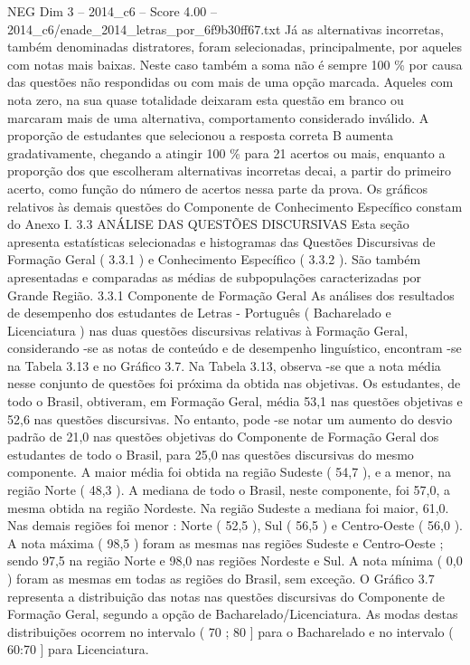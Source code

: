 \begin{textsample}{NEG Dim 3 – 2014\_c6 – Score 4.00 – 2014\_c6/enade\_2014\_letras\_por\_6f9b30ff67.txt}
Já as alternativas incorretas, também denominadas distratores, foram selecionadas, principalmente, por aqueles com notas mais baixas.
Neste caso também a soma não é sempre 100 \% por causa das questões não respondidas ou com mais de uma opção marcada.
Aqueles com nota zero, na sua quase totalidade deixaram esta questão em branco ou marcaram mais de uma alternativa, comportamento considerado inválido.
A proporção de estudantes que selecionou a resposta correta B aumenta gradativamente, chegando a atingir 100 \% para 21 acertos ou mais, enquanto a proporção dos que escolheram alternativas incorretas decai, a partir do primeiro acerto, como função do número de acertos nessa parte da prova.
Os gráficos relativos às demais questões do Componente de Conhecimento Específico constam do Anexo I. 3.3 ANÁLISE DAS QUESTÕES DISCURSIVAS Esta seção apresenta estatísticas selecionadas e histogramas das Questões Discursivas de Formação Geral ( 3.3.1 ) e Conhecimento Específico ( 3.3.2 ).
São também apresentadas e comparadas as médias de subpopulações caracterizadas por Grande Região. 3.3.1 Componente de Formação Geral As análises dos resultados de desempenho dos estudantes de Letras - Português ( Bacharelado e Licenciatura ) nas duas questões discursivas relativas à Formação Geral, considerando -se as notas de conteúdo e de desempenho linguístico, encontram -se na Tabela 3.13 e no Gráfico 3.7.
Na Tabela 3.13, observa -se que a nota média nesse conjunto de questões foi próxima da obtida nas objetivas.
Os estudantes, de todo o Brasil, obtiveram, em Formação Geral, média 53,1 nas questões objetivas e 52,6 nas questões discursivas.
No entanto, pode -se notar um aumento do desvio padrão de 21,0 nas questões objetivas do Componente de Formação Geral dos estudantes de todo o Brasil, para 25,0 nas questões discursivas do mesmo componente.
A maior média foi obtida na região Sudeste ( 54,7 ), e a menor, na região Norte ( 48,3 ).
A mediana de todo o Brasil, neste componente, foi 57,0, a mesma obtida na região Nordeste.
Na região Sudeste a mediana foi maior, 61,0.
Nas demais regiões foi menor : Norte ( 52,5 ), Sul ( 56,5 ) e Centro-Oeste ( 56,0 ).
A nota máxima ( 98,5 ) foram as mesmas nas regiões Sudeste e Centro-Oeste ; sendo 97,5 na região Norte e 98,0 nas regiões Nordeste e Sul.
A nota mínima ( 0,0 ) foram as mesmas em todas as regiões do Brasil, sem exceção.
O Gráfico 3.7 representa a distribuição das notas nas questões discursivas do Componente de Formação Geral, segundo a opção de Bacharelado/Licenciatura.
As modas destas distribuições ocorrem no intervalo ( 70 ; 80 ] para o Bacharelado e no intervalo ( 60:70 ] para Licenciatura.

\end{textsample}
